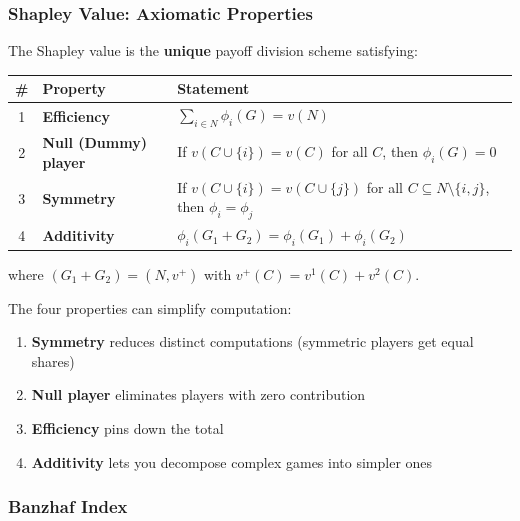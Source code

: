 \separator

\subsubsection{Shapley Value: Axiomatic Properties}

\begin{thmbox}
The Shapley value is the \textbf{unique} payoff division scheme satisfying:

\begin{center}
\renewcommand{\arraystretch}{1.4}
\begin{tabular}{@{} c l p{7.5cm} @{}}
\toprule
\textbf{\#} & \textbf{Property} & \textbf{Statement} \\
\midrule
1 & \textbf{Efficiency} & $\sum_{i \in N} \phi_i(G) = v(N)$ \\
2 & \textbf{Null (Dummy) player} & If $v(C \cup \{i\}) = v(C)$ for all $C$, then $\phi_i(G) = 0$ \\
3 & \textbf{Symmetry} & If $v(C \cup \{i\}) = v(C \cup \{j\})$ for all $C \subseteq N \setminus \{i,j\}$, then $\phi_i = \phi_j$ \\
4 & \textbf{Additivity} & $\phi_i(G_1 + G_2) = \phi_i(G_1) + \phi_i(G_2)$ \\
\bottomrule
\end{tabular}
\end{center}

where $(G_1 + G_2) = (N, v^+)$ with $v^+(C) = v^1(C) + v^2(C)$.
\end{thmbox}

\begin{tipbox}
The four properties can simplify computation:
\begin{enumerate}
  \item \textbf{Symmetry} reduces distinct computations (symmetric players get equal shares)
  \item \textbf{Null player} eliminates players with zero contribution
  \item \textbf{Efficiency} pins down the total
  \item \textbf{Additivity} lets you decompose complex games into simpler ones
\end{enumerate}
\end{tipbox}

\bigseparator

\subsubsection{Banzhaf Index}


